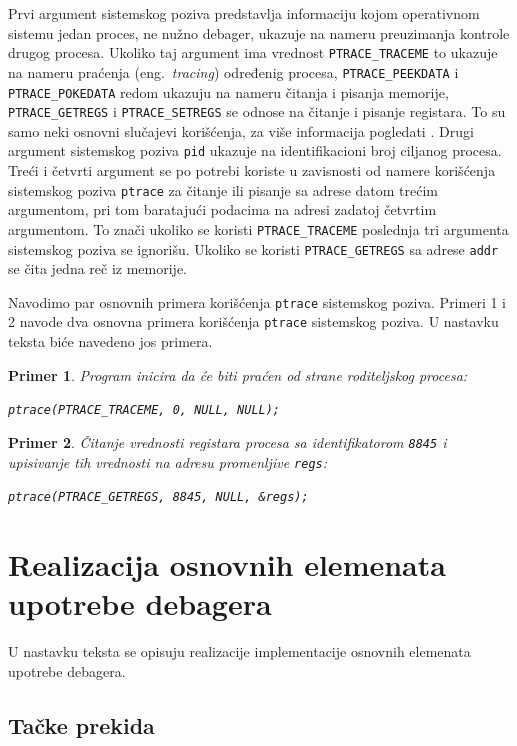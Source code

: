 \documentclass[12pt,oneside]{memoir}
\newtheorem{primer}{Primer}
\begin{document}
Prvi argument sistemskog poziva predstavlja informaciju kojom operativnom sistemu jedan proces, ne nužno debager, ukazuje na nameru preuzimanja kontrole drugog procesa. Ukoliko taj argument ima vrednost \texttt{PTRACE\_TRACEME} to ukazuje na nameru praćenja (eng.~\emph{tracing}) određenig procesa, \texttt{PTRACE\_PEEKDATA} i \texttt{PTRACE\_POKEDATA} redom ukazuju na nameru čitanja i pisanja  memorije, \texttt{PTRACE\_GETREGS} i \texttt{PTRACE\_SETREGS} se odnose na čitanje i pisanje registara. To su samo neki osnovni slučajevi korišćenja, za više informacija pogledati \cite{ptrace}. Drugi argument sistemskog poziva \texttt{pid} ukazuje na identifikacioni broj ciljanog procesa. Treći i četvrti argument se po potrebi koriste u zavisnosti od namere korišćenja sistemskog poziva \texttt{ptrace} za čitanje ili pisanje sa adrese datom trećim argumentom, pri tom baratajući podacima na adresi zadatoj četvrtim argumentom. To znači ukoliko se koristi \texttt{PTRACE\_TRACEME} poslednja tri argumenta sistemskog poziva se ignorišu. Ukoliko se koristi \texttt{PTRACE\_GETREGS} sa adrese \texttt{addr} se čita jedna reč iz memorije.

Navodimo par osnovnih primera korišćenja \texttt{ptrace} sistemskog poziva. Primeri 1 i 2 navode dva osnovna primera korišćenja \texttt{ptrace} sistemskog poziva. U nastavku teksta biće navedeno jos primera.

\begin{primer}
Program inicira da će biti praćen od strane roditeljskog procesa:

\texttt{ptrace(PTRACE\_TRACEME, 0, NULL, NULL);}
\end{primer}

\begin{primer}
Čitanje vrednosti registara procesa sa identifikatorom \texttt{8845} i upisivanje tih vrednosti na adresu promenljive \texttt{regs}:

\texttt{ptrace(PTRACE\_GETREGS, 8845, NULL, \&regs);}

\end{primer}

\section{Realizacija osnovnih elemenata upotrebe debagera}

U nastavku teksta se opisuju realizacije implementacije osnovnih elemenata upotrebe debagera.

\subsection{Tačke prekida}
\end{document}
